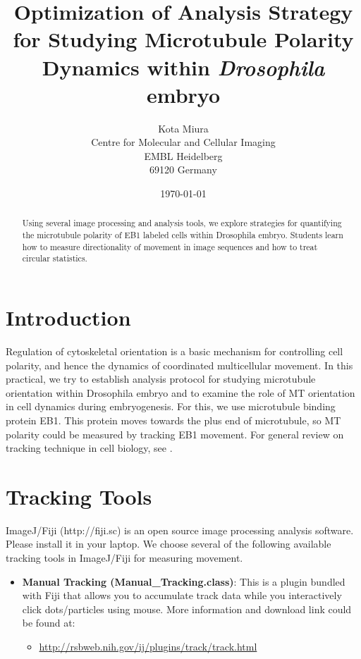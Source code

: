 \documentclass[11pnt, twocolumn]{article}
\begin{document}
\author{Kota Miura\\
  Centre for Molecular and Cellular Imaging\\
  EMBL Heidelberg\\
  69120  Germany}
\date{\today}
\title{Optimization of Analysis Strategy for Studying Microtubule Polarity Dynamics within \textit{Drosophila} embryo}
\maketitle

\begin{abstract}
Using several image processing and analysis tools, we explore strategies for quantifying the microtubule polarity of EB1 labeled cells within Drosophila embryo. Students learn how to measure directionality of movement in image sequences and how to treat circular statistics. 
\end{abstract}

\section{Introduction}

Regulation of cytoskeletal orientation is a basic mechanism for controlling cell polarity, and hence the dynamics of coordinated multicellular movement. In this practical, we try to establish analysis protocol for studying microtubule orientation within Drosophila embryo and to examine the role of MT orientation in cell dynamics during embryogenesis. For this, we use microtubule binding protein EB1. This protein moves towards the plus end of microtubule, so MT polarity could be measured by tracking EB1 movement. For general review on tracking technique in cell biology, see \citep{Miura2005,Meijering2006}. 

\section{Tracking Tools}

ImageJ/Fiji (http://fiji.sc) is an open source image processing analysis software. Please install it in your laptop. We choose several of the following available tracking tools in ImageJ/Fiji for measuring movement. 

\begin{itemize}
\item \textbf{Manual Tracking (Manual\_Tracking.class)}: 
This is a plugin bundled with Fiji that allows you to accumulate track data while you interactively click dots/particles using mouse. More information and download link could be found at:
\begin{itemize}
\item \url{http://rsbweb.nih.gov/ij/plugins/track/track.html}
\end{itemize}
\end{itemize}
\end{document}
